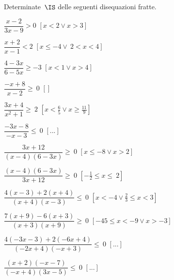 \begin{esercizio}[]
\label{ese:21.55}
Determinate~$\IS$ delle seguenti disequazioni fratte.
\begin{enumeratea}
\spazielenx
\item $\dfrac{x-2}{3x-9}>0$ \hfill $\left[x<2\vee x>3\right]$
\item $\dfrac{x+2}{x-1}<2$ \hfill $\left[x\le -4\vee~2<x<4\right]$
\item $\dfrac{4-3x}{6-5x}\geqslant -3$ \hfill $\left[x<1\vee x>4\right]$
\item $\dfrac{-x+8}{x-2}\ge~0$ \hfill $\left[\right]$
\item $\dfrac{3x+4}{x^{2}+1}\ge~2$ 
 \hfill $\left[x<\frac{6}{5}\vee x\ge\frac{11}{9}\right]$
\item $\dfrac{-3x-8}{-x-3}\le~0$ \hfill $\left[...\right]$
\item $\dfrac{3x+12}{(x-4)(6-3x)}\geqslant~0$
 \hfill $\left[x\le -8\vee x>2\right]$
\item $\dfrac{(x-4)(6-3x)}{3x+12}\geqslant~0$
 \hfill $\left[-{\frac{1}{2}}\le x\le~2\right]$
\item $\dfrac{4(x-3)+2(x+4)}{(x+4)(x-3)}\leqslant~0$
 \hfill $\left[x<-4\vee\frac{2}{3}\le x<3\right]$
\item $\dfrac{7(x+9)-6(x+3)}{(x+3)(x+9)}\geqslant~0$
 \hfill $\left[-45\le x<-9\vee x>-3\right]$
\item $\dfrac{4(-3x-3)+2(-6x+4)}{(-2x+4)(-x+3)}\leqslant~0$
 \hfill $\left[...\right]$
\item $\dfrac{(x+2)(-x-7)}{(-x+4)(3x-5)}\leqslant~0$
 \hfill $\left[...\right]$
\end{enumeratea}
\end{esercizio}

